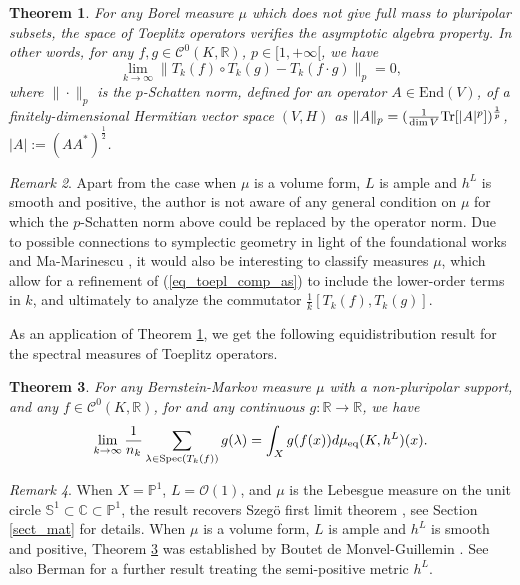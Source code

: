 \documentclass[12pt]{article}
\numberwithin{equation}{section}
\theoremstyle{theorem}
\newtheorem{thm}{Theorem}[section]
\theoremstyle{definition}
\theoremstyle{remark}
\newtheorem{rem}[thm]{Remark}
\newcommand{\real}{\mathbb{R}}
\newcommand{\enmr}[1]{\text{End}{(#1)}}
\newcommand{\ccal}{\mathscr{C}}
\begin{document}
	\begin{thm}\label{cor_alg}	
		For any Borel measure $\mu$ which does not give full mass to pluripolar subsets, the space of Toeplitz operators verifies the asymptotic algebra property.
		In other words, for any $f, g \in \ccal^0(K, \real)$, $p \in [1, +\infty[$, we have
		\begin{equation}\label{eq_toepl_comp_as}
			\lim_{k \to \infty} \| T_k(f) \circ T_k(g) - T_k(f \cdot g) \|_p = 0,
		\end{equation}
		where $\| \cdot \|_p$ is the $p$-Schatten norm, defined for an operator $A \in {\enmr{V}}$, of a finitely-dimensional Hermitian vector space $(V, H)$ as $\| A \|_p = (\frac{1}{\dim V} {\rm{Tr}}[|A|^p])^{\frac{1}{p}}$, $|A| := (A A^*)^{\frac{1}{2}}$.
	\end{thm}
	\begin{rem}
		Apart from the case when $\mu$ is a volume form, $L$ is ample and $h^L$ is smooth and positive, the author is not aware of any general condition on $\mu$ for which the $p$-Schatten norm above could be replaced by the operator norm. 
		Due to possible connections to symplectic geometry in light of the foundational works \cite{BordMeinSchli} and Ma-Marinescu \cite{MaMarBTKah}, it would also be interesting to classify measures $\mu$, which allow for a refinement of (\ref{eq_toepl_comp_as}) to include the lower-order terms in $k$, and ultimately to analyze the commutator $\frac{1}{k} [T_k(f), T_k(g)]$.
	\end{rem}
	\par 
	As an application of Theorem \ref{cor_alg}, we get the following equidistribution result for the spectral measures of Toeplitz operators.
	\begin{thm}\label{thm_distr}
		For any Bernstein-Markov measure $\mu$ with a non-pluripolar support, and any $f \in \ccal^0(K, \real)$, for and any continuous $g: \real \to \real$, we have
		\begin{equation}
			\lim_{k \to \infty} \frac{1}{n_k} \sum_{\lambda \in {\rm{Spec}} (T_k(f))} g(\lambda)
			=
			\int_X g(f(x)) d \mu_{\mathrm{eq}}(K, h^L)(x).
		\end{equation}
	\end{thm}
	\begin{rem}
		When $X = \mathbb{P}^1$, $L = \mathscr{O}(1)$, and $\mu$ is the Lebesgue measure on the unit circle $\mathbb{S}^1 \subset \mathbb{C} \subset \mathbb{P}^1$, the result recovers Szeg\"o first limit theorem \cite{SzegoFST}, see Section \ref{sect_mat} for details.
		When $\mu$ is a volume form, $L$ is ample and $h^L$ is smooth and positive, Theorem \ref{thm_distr} was established by Boutet de Monvel-Guillemin \cite{BoutGuillSpecToepl}. 
		See also Berman \cite[Theorem 2.7]{BermanSuperToepl} for a further result treating the semi-positive metric $h^L$.
	\end{rem}
\end{document}
